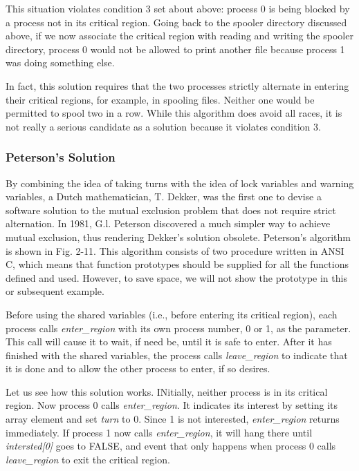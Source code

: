 \documentclass{book}
\newcommand {\sys} [1] {\textsl{#1}}
\begin{document}
This situation violates condition 3 set about above: 
process 0 is being blocked by a process not in its critical region.
Going back to the spooler directory discussed above,
if we now associate the critical region with reading and writing the spooler directory, 
process 0 would not be allowed to print another file because process 1 was doing something else.

In fact, this solution requires that the two processes strictly alternate in entering their critical regions,
for example, in spooling files.
Neither one would be permitted to spool two in a row.
While this algorithm does avoid all races, it is not really a serious candidate as a solution 
because it violates condition 3.

\subsubsection*{Peterson's Solution}
By combining the idea of taking turns with the idea of lock variables and warning variables,
a Dutch mathematician, T. Dekker, was the first one to devise a software solution to the mutual exclusion problem
that does not require strict alternation.
In 1981, G.l. Peterson discovered a much simpler way to achieve mutual exclusion, 
thus rendering Dekker's solution obsolete.
Peterson's algorithm is shown in Fig. 2-11.
This algorithm consists of two procedure written in ANSI C, 
which means that function prototypes should be supplied for all the functions defined and used.
However, to save space, we will not show the prototype in this or subsequent example.

Before using the shared variables (i.e., before entering its critical region),
each process calls \sys{enter\_region} with its own process number, 0 or 1, as the parameter.
This call will cause it to wait, if need be, until it is safe to enter.
After it has finished with the shared variables, the process calls \sys{leave\_region} to indicate that it is done 
and to allow the other process to enter, if so desires.

Let us see how this solution works.
INitially, neither process is in its critical region.
Now process 0 calls \sys{enter\_region}.
It indicates its interest by setting its array element and set \sys{turn} to 0.
Since 1 is not interested, \sys{enter\_region} returns immediately.
If process 1 now calls \sys{enter\_region}, it will hang there until \sys{intersted[0]} goes to FALSE, 
and event that only happens when process 0 calls \sys{leave\_region} to exit the critical region.
\end{document}
